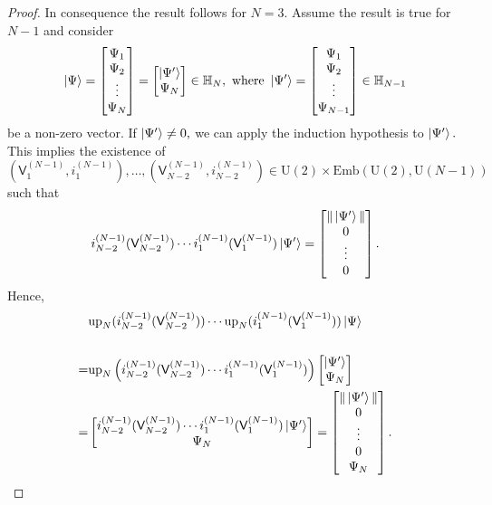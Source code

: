 \documentclass[10pt,a4paper]{amsart}
\newcommand{\rV}{\mathsf{V}}
\begin{document}
\begin{proof}
      In consequence the result follows for $N=3.$ Assume the result is true for $N-1$ and consider 
      $$
      \ket{\Psi} = \begin{bmatrix} \Psi_1 \\ \Psi_2 \\ \vdots \\ \Psi_{N} \end{bmatrix} = \begin{bmatrix}\ket{\Psi^{\prime}}\\ \Psi_N \end{bmatrix} \in \mathbb{H}_N, \text{ where } \ket{\Psi'} = \begin{bmatrix} \Psi_1 \\ \Psi_2 \\ \vdots \\ \Psi_{N-1} \end{bmatrix} \in \mathbb{H}_{N-1}
      $$ 
      be a non-zero vector. If $\ket{\Psi^{\prime}} \neq 0,$ we can apply the induction hypothesis to $\ket{\Psi^{\prime}}.$ This implies the existence of $(\rV_1^{(N-1)},i_1^{(N-1)}),\ldots,(\rV_{N-2}^{(N-1)},i_{N-2}^{(N-1)}) \in\mathrm{U}(2) \times\mathrm{Emb}(\mathrm{U}(2),\mathrm{U}(N-1)) $ such that 
      $$
      i_{N-2}^{(N-1)}(\rV_{N-2}^{(N-1)}) \cdots i_1^{(N-1)}(\rV_1^{(N-1)}) \ket{\Psi^{\prime}} =  \begin{bmatrix} \|\ket{\Psi^{\prime}}\| \\ 0 \\ \vdots  \\ 0 \end{bmatrix}.
      $$
    Hence, 
    \begin{align*}
    & \mathrm{up}_N(i_{N-2}^{(N-1)}(\rV_{N-2}^{(N-1)})) \cdots  \mathrm{up}_N(i_1^{(N-1)}(\rV_1^{(N-1)})) \ket{\Psi} \\ 
    & \\
    = & \mathrm{up}_N\left(i_{N-2}^{(N-1)}(\rV_{N-2}^{(N-1)}) \cdots  i_1^{(N-1)}(\rV_1^{(N-1)})\right)  \begin{bmatrix}\ket{\Psi^{\prime}}\\ \Psi_N \end{bmatrix}
    \\ 
    = & \begin{bmatrix} i_{N-2}^{(N-1)}(\rV_{N-2}^{(N-1)}) \cdots i_1^{(N-1)}(\rV_1^{(N-1)}) \ket{\Psi^{\prime}} \\ \Psi_N \end{bmatrix} = \begin{bmatrix} \|\ket{\Psi^{\prime}}\| \\ 0 \\ \vdots  \\ 0 \\ \Psi_N \end{bmatrix}.

\end{align*}
\end{proof}
\end{document}
